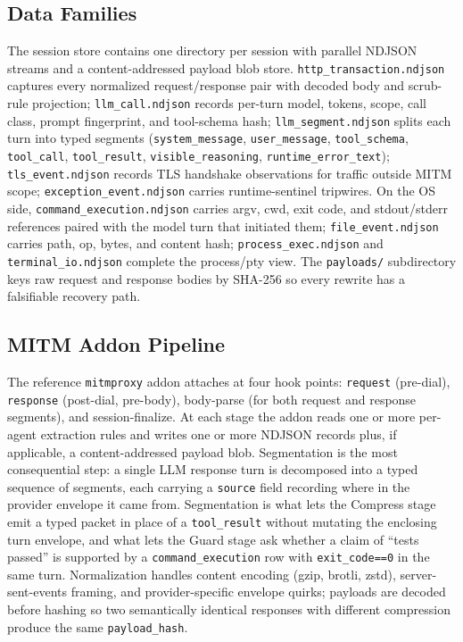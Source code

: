 \documentclass[conference]{IEEEtran}
\begin{document}
\subsection{Data Families}
\label{app:warpos-data}

The session store contains one directory per session with parallel NDJSON streams and a content-addressed payload blob store. \texttt{http\_transaction.ndjson} captures every normalized request/response pair with decoded body and scrub-rule projection; \texttt{llm\_call.ndjson} records per-turn model, tokens, scope, call class, prompt fingerprint, and tool-schema hash; \texttt{llm\_segment.ndjson} splits each turn into typed segments (\texttt{system\_message}, \texttt{user\_message}, \texttt{tool\_schema}, \texttt{tool\_call}, \texttt{tool\_result}, \texttt{visible\_reasoning}, \texttt{runtime\_error\_text}); \texttt{tls\_event.ndjson} records TLS handshake observations for traffic outside MITM scope; \texttt{exception\_event.ndjson} carries runtime-sentinel tripwires. On the OS side, \texttt{command\_execution.ndjson} carries argv, cwd, exit code, and stdout/stderr references paired with the model turn that initiated them; \texttt{file\_event.ndjson} carries path, op, bytes, and content hash; \texttt{process\_exec.ndjson} and \texttt{terminal\_io.ndjson} complete the process/pty view. The \texttt{payloads/} subdirectory keys raw request and response bodies by SHA-256 so every rewrite has a falsifiable recovery path.

\subsection{MITM Addon Pipeline}
\label{app:warpos-mitm}

The reference \texttt{mitmproxy} addon attaches at four hook points: \texttt{request} (pre-dial), \texttt{response} (post-dial, pre-body), body-parse (for both request and response segments), and session-finalize. At each stage the addon reads one or more per-agent extraction rules and writes one or more NDJSON records plus, if applicable, a content-addressed payload blob. Segmentation is the most consequential step: a single LLM response turn is decomposed into a typed sequence of segments, each carrying a \texttt{source} field recording where in the provider envelope it came from. Segmentation is what lets the Compress stage emit a typed packet in place of a \texttt{tool\_result} without mutating the enclosing turn envelope, and what lets the Guard stage ask whether a claim of ``tests passed'' is supported by a \texttt{command\_execution} row with \texttt{exit\_code==0} in the same turn. Normalization handles content encoding (gzip, brotli, zstd), server-sent-events framing, and provider-specific envelope quirks; payloads are decoded before hashing so two semantically identical responses with different compression produce the same \texttt{payload\_hash}.
\end{document}
